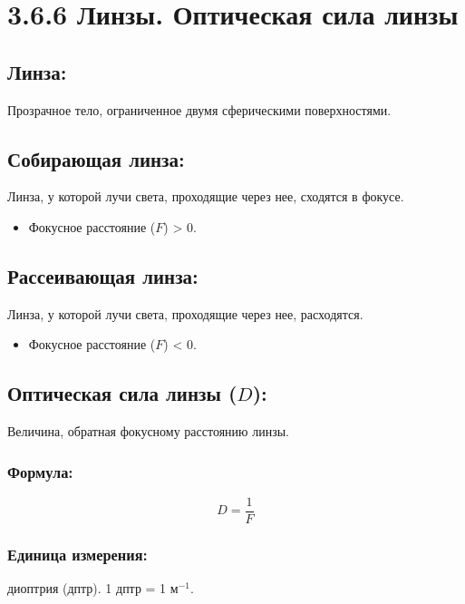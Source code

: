 \documentclass[a4paper,12pt]{article}
\begin{document}
\section*{3.6.6 Линзы. Оптическая сила линзы}
\vspace{-9pt}
\subsection*{Линза:}
\vspace{-3pt}
Прозрачное тело, ограниченное двумя сферическими поверхностями.

\vspace{-9pt}
\subsection*{Собирающая линза:}
\vspace{-3pt}
Линза, у которой лучи света, проходящие через нее, сходятся в фокусе.
\begin{itemize}
    \item Фокусное расстояние ($F$) > 0.
\end{itemize}

\vspace{-9pt}
\subsection*{Рассеивающая линза:}
\vspace{-3pt}
Линза, у которой лучи света, проходящие через нее, расходятся.
\begin{itemize}
    \item Фокусное расстояние ($F$) < 0.
\end{itemize}

\vspace{-9pt}
\subsection*{Оптическая сила линзы ($D$):}
\vspace{-3pt}
Величина, обратная фокусному расстоянию линзы.
\subsubsection*{Формула:}
\vspace{-0.05em}
$$ D = \frac{1}{F} $$
\subsubsection*{Единица измерения:} диоптрия (дптр). 1 дптр = 1 $м^{-1}$.
\end{document}
